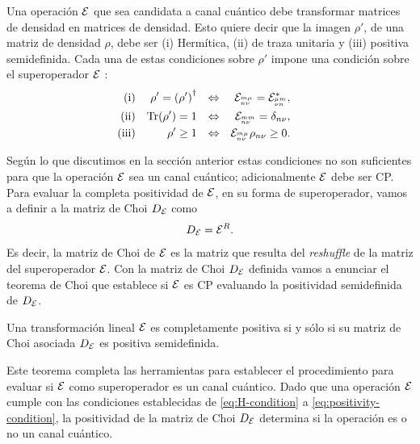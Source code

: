 Una operación $\mathcal{E}$ que sea candidata a canal cuántico debe transformar 
matrices de densidad en matrices de densidad. Esto quiere decir que
la imagen $\rho'$, de una matriz de densidad $\rho$, debe ser (i) Hermítica, 
(ii) de traza unitaria y (iii) positiva semidefinida. 
Cada una de estas condiciones sobre $\rho'$ impone una condición 
sobre el superoperador $\mathcal{E}$ \cite{bengtsson_zyczkowski_2017}:
\begin{align}
\text{(i)}&& \rho'=\qty(\rho')^{\dagger}&&\Leftrightarrow
    && \mathcal{E}_{{}^{m\mu}_{n\nu}}=\mathcal{E}_{{}^{\mu m}_{\nu n}}^*,&&
    \label{eq:H-condition}\\
\text{(ii)}&&\Tr(\rho')=1
    &&\Leftrightarrow&&  \mathcal{E}_{{}^{mm}_{n\nu}}=\delta_{n\nu},\\     
\text{(iii)}&&\rho'\geq1
    &&\Leftrightarrow&&  \mathcal{E}_{{}^{m\mu}_{n\nu}}\rho_{n\nu}\geq0.
    \label{eq:positivity-condition}
\end{align}

Según lo que discutimos en la sección anterior estas condiciones
no son suficientes para que la operación $\mathcal{E}$ sea un canal cuántico; adicionalmente 
$\mathcal{E}$ debe ser CP. Para evaluar la completa positividad de $\mathcal{E}$, en su forma 
de superoperador, vamos a definir a la matriz de Choi $D_{\mathcal{E}}$ como 
\cite{bengtsson_zyczkowski_2017}
\begin{align}
D_{\mathcal{E}}=\mathcal{E}^{R}.
\end{align}
Es decir, la matriz de Choi de $\mathcal{E}$ es la matriz que resulta del \textit{reshuffle}
de la matriz del superoperador $\mathcal{E}$. 
Con la matriz de Choi $D_{\mathcal{E}}$ definida vamos a enunciar 
el teorema de Choi \cite{bengtsson_zyczkowski_2017} que
establece si $\mathcal{E}$ es CP evaluando la positividad semidefinida de $D_{\mathcal{E}}$.
\begin{teorema}
Una transformación lineal $\mathcal{E}$ es completamente positiva si y sólo si 
su matriz de Choi asociada $D_{\mathcal{E}}$ es positiva semidefinida.
\end{teorema}
Este teorema completa las herramientas para establecer el procedimiento 
para evaluar si $\mathcal{E}$ como superoperador es un canal cuántico. 
Dado que una operación $\mathcal{E}$ cumple con las condiciones establecidas de
\eqref{eq:H-condition} a \eqref{eq:positivity-condition}, la positividad
de la matriz de Choi $D_{\mathcal{E}}$ determina si la operación es 
o no un canal cuántico.

